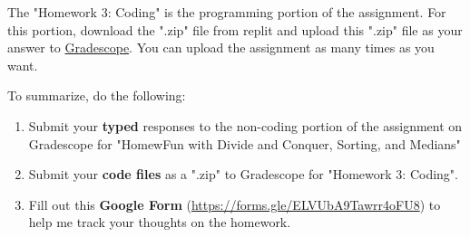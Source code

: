 \documentclass [12pt]{article}
\begin{document}
The "Homework 3: Coding" is the programming portion of the assignment. For this portion, download the ".zip" file from replit and upload this ".zip" file as your answer to \href{https://www.gradescope.com/courses/350304}{Gradescope}. You can upload the assignment as many times as you want.


To summarize, do the following:
\begin{enumerate}
    \item Submit your \textbf{typed} responses to the non-coding portion of the assignment on Gradescope for "HomewFun with Divide and Conquer, Sorting, and Medians"
    \item Submit your \textbf{code files} as a ".zip" to Gradescope for "Homework 3: Coding".
    \item Fill out this \textbf{Google Form} (\href{https://forms.gle/ELVUbA9Tawrr4oFU8}{https://forms.gle/ELVUbA9Tawrr4oFU8}) to help me track your thoughts on the homework.
\end{enumerate}
\end{document}
